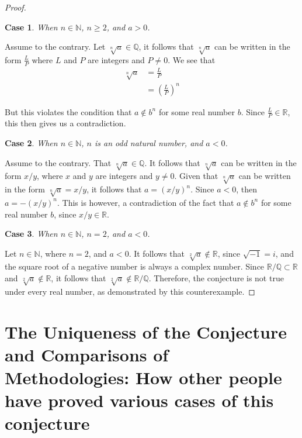 \documentclass{article}
\newtheorem{case}{Case}
\begin{document}
\begin{proof}
    \begin{case}
        When \(n \in \mathds{N}\), \(n \geq 2\), and \(a > 0\).
    \end{case}
    
    Assume to the contrary. Let \(\sqrt[n]{a} \in \mathds{Q}\), it follows that \(\sqrt[n]{a}\) can be written in the form \(\frac{L}{P}\) where \(L\) and \(P\) are integers and \(P \neq 0\). We see that 
    \begin{align*}
        \sqrt[n]{a} &= \frac{L}{P} \\ 
                    &= \left(\frac{L}{P}\right)^n 
    \end{align*} 
    
    But this violates the condition that \(a \notin b^n\) for some real number $b$. Since \(\frac{L}{P} \in \mathds{R}\), this then gives us a contradiction. 

    \begin{case}
        When \(n \in \mathds{N}\), \(n\) is an odd natural number, and \(a < 0\). 
    \end{case}

Assume to the contrary. That \(\sqrt[n]{a} \in \mathds{Q}\). It follows that \(\sqrt[n]{a}\) can be written in the form \(x/y\), where \(x\) and \(y\) are integers and \(y \neq 0\). Given that \(\sqrt[n]{a}\) can be written in the form \(\sqrt[n]{a} = x/y\), it follows that \(a = (x/y)^n\). Since \(a < 0\), then \(a = -(x/y)^n\).  This is however, a contradiction of the fact that \(a \notin b^n\) for some real number $b$, since \(x/y \in \mathds{R}\). 

   \begin{case}
       When \(n \in \mathds{N}\), \(n = 2\), and \(a < 0\). 
   \end{case} 

Let \(n \in \mathds{N}\), where \(n = 2\), and \(a < 0\). It follows that \(\sqrt[2]{a} \notin \mathds{R}\), since \(\sqrt{-1} = i\), and the square root of a negative number is always a complex number. Since \(\mathds{R/Q} \subset \mathds{R}\) and \(\sqrt[2]{a} \notin \mathds{R}\), it follows that \(\sqrt[2]{a} \notin \mathds{R/Q}\). Therefore, the conjecture is not true under every real number, as demonstrated by this counterexample. 

\end{proof}

\section{The Uniqueness of the Conjecture and Comparisons of Methodologies: How other people have proved various cases of this conjecture}      
\end{document}
